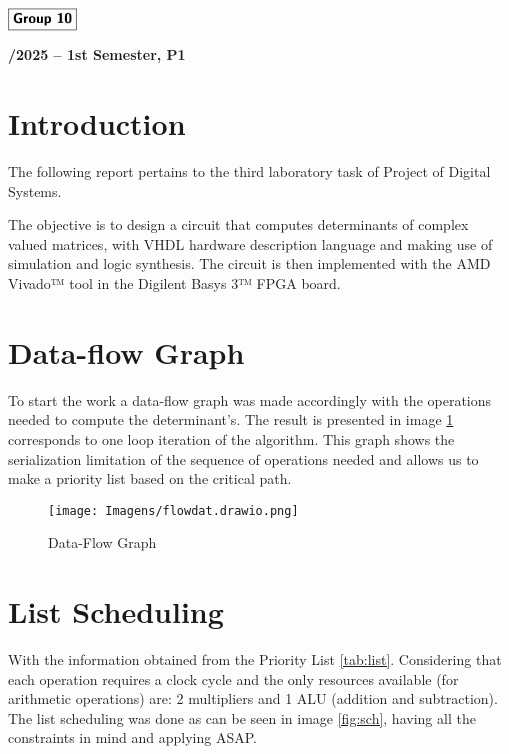 \documentclass[12pt]{article}
\begin{document}
\begin{flushleft}
    \large $\boxed{\text{\bf \fontfamily{cmss}\selectfont Group 10}}$\\[4.0cm]
\end{flushleft}
    
\begin{center}
    \large \bf {}/2025 -- 1st Semester, P1
\end{center}

\thispagestyle{empty}

\setcounter{page}{0}

\newpage



\section{Introduction}
The following report pertains to the third laboratory task of Project of Digital Systems.

The objective is to design a circuit that computes determinants of complex valued matrices, with VHDL hardware description language and making use of simulation and logic synthesis. The circuit is then implemented with the AMD Vivado™ tool in the Digilent Basys 3™ FPGA board. 

\section{Data-flow Graph}
To start the work a data-flow graph was made accordingly with the operations needed to compute the determinant's. The result is presented in image \ref{fig:data} corresponds to one loop iteration of the algorithm. This graph shows the serialization limitation of the sequence of operations needed and allows us to make a priority list based on the critical path.

\begin{figure}[H]
	\centering
	\texttt{[image: Imagens/flowdat.drawio.png]}
	\caption{Data-Flow Graph}
	\label{fig:data}
\end{figure}

\section{List Scheduling}
With the information obtained from the Priority List \ref{tab:list}. Considering that each operation requires a clock cycle and the only resources available (for arithmetic operations) are: 2 multipliers and 1 ALU (addition and subtraction). The list scheduling was done as can be seen in image \ref{fig:sch}, having all the constraints in mind and applying ASAP.
\end{document}
